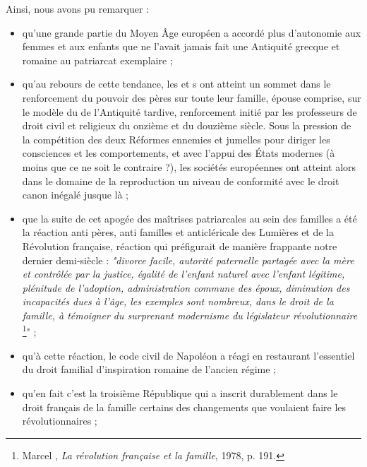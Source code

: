  Ainsi, nous avons pu remarquer : 
\begin{itemize}

\item qu'une grande partie du Moyen Âge européen a accordé plus d'autonomie aux femmes et aux enfants que ne l'avait jamais fait une Antiquité grecque et romaine au patriarcat exemplaire ;

\item qu'au rebours de cette tendance, les  et s ont atteint un sommet dans le renforcement du pouvoir des pères sur toute leur famille, épouse comprise, sur le modèle du  de l'Antiquité tardive, renforcement initié par les professeurs de droit civil et religieux du onzième et du douzième siècle. Sous la pression de la compétition des deux Réformes ennemies et jumelles pour diriger les consciences et les comportements, et avec l'appui des États modernes (à moins que ce ne soit le contraire ?), les sociétés européennes ont atteint alors dans le domaine de la reproduction un niveau de conformité avec le droit canon inégalé jusque là ;

\item que la suite de cet apogée des maîtrises patriarcales au sein des familles a été la réaction anti pères, anti familles et anticléricale des Lumières et de la Révolution française, réaction qui préfigurait de manière frappante notre dernier demi-siècle : \emph{"divorce facile, autorité paternelle partagée avec la mère et contrôlée par la justice, égalité de l'enfant naturel avec l'enfant légitime, plénitude de l'adoption, administration commune des époux, diminution des incapacités dues à l'âge, les exemples sont nombreux, dans le droit de la famille, à témoigner du surprenant modernisme du législateur révolutionnaire}
\footnote{Marcel , \emph{La révolution française et la famille}, 1978, p. 191.}" ;

\item qu'à cette réaction, le code civil de Napoléon a réagi en restaurant l'essentiel du droit familial d'inspiration romaine de l'ancien régime ;
 
\item qu'en fait c'est la troisième République qui a inscrit durablement dans le droit français de la famille certains des changements que voulaient faire les révolutionnaires ;
 

\end{itemize}
